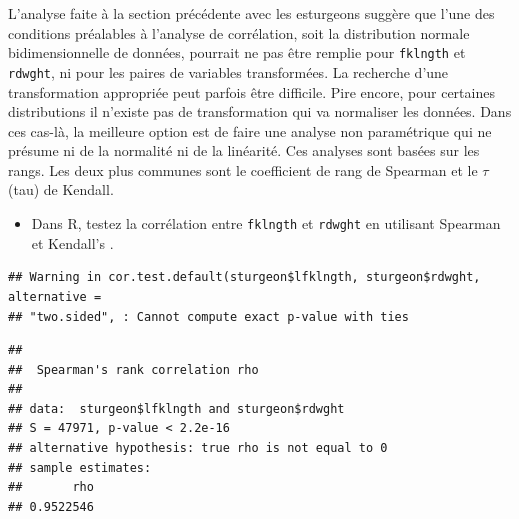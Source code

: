 \documentclass[
  12pt,
]{book}
\newenvironment{Shaded}{\begin{snugshade}}{\end{snugshade}}
\newcommand{\DataTypeTok}[1]{\textcolor[rgb]{0.13,0.29,0.53}{#1}}
\newcommand{\KeywordTok}[1]{\textcolor[rgb]{0.13,0.29,0.53}{\textbf{#1}}}
\newcommand{\NormalTok}[1]{#1}
\newcommand{\OperatorTok}[1]{\textcolor[rgb]{0.81,0.36,0.00}{\textbf{#1}}}
\newcommand{\StringTok}[1]{\textcolor[rgb]{0.31,0.60,0.02}{#1}}
\providecommand{\tightlist}{%
  \setlength{\itemsep}{0pt}\setlength{\parskip}{0pt}}
\begin{document}
L'analyse faite à la section précédente avec les esturgeons suggère que l'une des conditions préalables à l'analyse de corrélation, soit la distribution normale bidimensionnelle de données, pourrait ne pas être remplie pour \texttt{fklngth} et \texttt{rdwght}, ni pour les paires de variables transformées.
La recherche d'une transformation appropriée peut parfois être difficile.
Pire encore, pour certaines distributions il n'existe pas de transformation qui va normaliser les données.
Dans ces cas-là, la meilleure option est de faire une analyse non
paramétrique qui ne présume ni de la normalité ni de la linéarité.
Ces analyses sont basées sur les rangs.
Les deux plus communes sont le coefficient de rang de Spearman et le \(\tau\) (tau) de Kendall.

\begin{itemize}
\tightlist
\item
  Dans R, testez la corrélation entre \texttt{fklngth} et \texttt{rdwght} en utilisant Spearman et Kendall's .
\end{itemize}

\begin{Shaded}
\end{Shaded}

\begin{verbatim}
## Warning in cor.test.default(sturgeon$lfklngth, sturgeon$rdwght, alternative =
## "two.sided", : Cannot compute exact p-value with ties
\end{verbatim}

\begin{verbatim}
## 
##  Spearman's rank correlation rho
## 
## data:  sturgeon$lfklngth and sturgeon$rdwght
## S = 47971, p-value < 2.2e-16
## alternative hypothesis: true rho is not equal to 0
## sample estimates:
##       rho 
## 0.9522546
\end{verbatim}

\begin{Shaded}
\end{Shaded}
\end{document}
